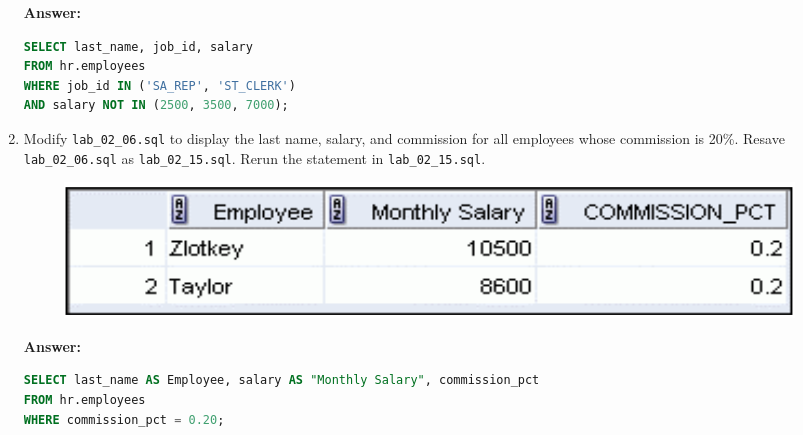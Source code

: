 \documentclass[a4paper,12pt]{article}
\begin{document}
\begin{enumerate}
\textbf{Answer: }
    \begin{lstlisting}[language=SQL, label={lst:employees_data}]
SELECT last_name, job_id, salary
FROM hr.employees
WHERE job_id IN ('SA_REP', 'ST_CLERK')
AND salary NOT IN (2500, 3500, 7000);
    \end{lstlisting}
    \item Modify \texttt{lab\_02\_06.sql} to display the last name, salary, and commission for all employees
whose commission is 20\%. Resave \texttt{lab\_02\_06.sql} as \texttt{lab\_02\_15.sql}. Rerun the
statement in \texttt{lab\_02\_15.sql}.
\begin{figure}[h]
    \centering
    \includegraphics*[width=.4\linewidth]{graphics/215.png}
\end{figure}

\textbf{Answer: }
    \begin{lstlisting}[language=SQL, label={lst:employees_data}]
SELECT last_name AS Employee, salary AS "Monthly Salary", commission_pct
FROM hr.employees
WHERE commission_pct = 0.20;
    \end{lstlisting}
\end{enumerate}
\end{document}
